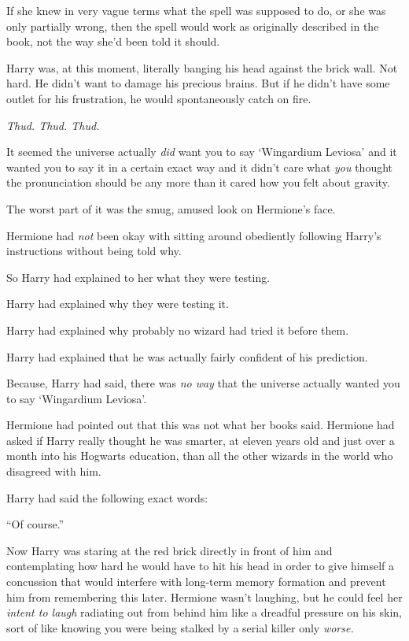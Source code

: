 If she knew in very vague terms what the spell was supposed to do, or she was only partially wrong, then the spell would work as originally described in the book, not the way she’d been told it should.

Harry was, at this moment, literally banging his head against the brick wall. Not hard. He didn’t want to damage his precious brains. But if he didn’t have some outlet for his frustration, he would spontaneously catch on fire.

\emph{Thud. Thud. Thud.}

It seemed the universe actually \emph{did} want you to say ‘Wingardium Leviosa’ and it wanted you to say it in a certain exact way and it didn’t care what \emph{you} thought the pronunciation should be any more than it cared how you felt about gravity.

\emph{}

The worst part of it was the smug, amused look on Hermione’s face.

Hermione had \emph{not} been okay with sitting around obediently following Harry’s instructions without being told why.

So Harry had explained to her what they were testing.

Harry had explained why they were testing it.

Harry had explained why probably no wizard had tried it before them.

Harry had explained that he was actually fairly confident of his prediction.

Because, Harry had said, there was \emph{no way} that the universe actually wanted you to say ‘Wingardium Leviosa’.

Hermione had pointed out that this was not what her books said. Hermione had asked if Harry really thought he was smarter, at eleven years old and just over a month into his Hogwarts education, than all the other wizards in the world who disagreed with him.

Harry had said the following exact words:

“Of course.”

Now Harry was staring at the red brick directly in front of him and contemplating how hard he would have to hit his head in order to give himself a concussion that would interfere with long-term memory formation and prevent him from remembering this later. Hermione wasn’t laughing, but he could feel her \emph{intent to laugh} radiating out from behind him like a dreadful pressure on his skin, sort of like knowing you were being stalked by a serial killer only \emph{worse.}

